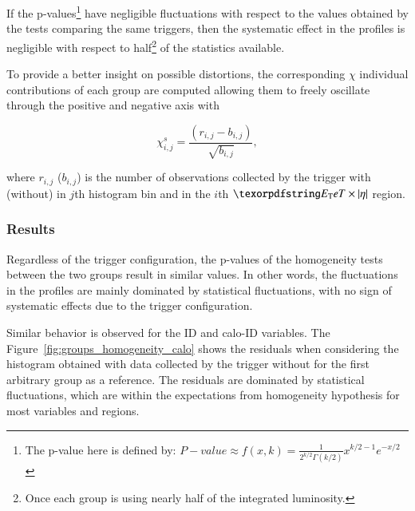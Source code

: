 If the p-values\footnote{The p-value here is defined by: $P-value \approx f(x, k) = \frac{1}{2^{k/2}\Gamma(k/2)}x^{k/2 -1}e^{-x/2}$} have negligible fluctuations with respect to the values obtained by the tests comparing the same triggers, then the systematic effect in the profiles is negligible with respect to half\footnote{Once each group is using nearly half of the integrated luminosity.} of the statistics available.



To provide a better insight on possible distortions, the corresponding $\chi$
individual contributions of each group are computed allowing them to freely
oscillate through the positive and negative axis with

\begin{equation}
  \chi_{i,j}^{s} = \frac{(r_{i,j} - b_{i,j})}{\sqrt{b_{i,j}}},
  \label{eq:signed_chi}
\end{equation}

\noindent where $r_{i,j}$ ($b_{i,j}$) is the number of observations collected by
the trigger with (without) \rnn{} in $j$th histogram bin and in the $i$th
$\et{}\times\abseta{}$ region.


\subsubsection{Results}\label{top:agreement_homogeneity_results}




Regardless of the trigger configuration, the p-values of the homogeneity tests between the two groups result in similar values. In other words, the fluctuations in the profiles are mainly dominated by statistical fluctuations, with no sign of systematic effects due to the trigger configuration. 

Similar behavior is observed for the ID and calo-ID variables. The Figure~\ref{fig:groups_homogeneity_calo} shows the residuals when considering the histogram obtained with data collected by the trigger without \rnn{} for the first arbitrary group as a reference. The residuals are dominated by statistical fluctuations, which are within the expectations from homogeneity hypothesis for most variables and regions.



